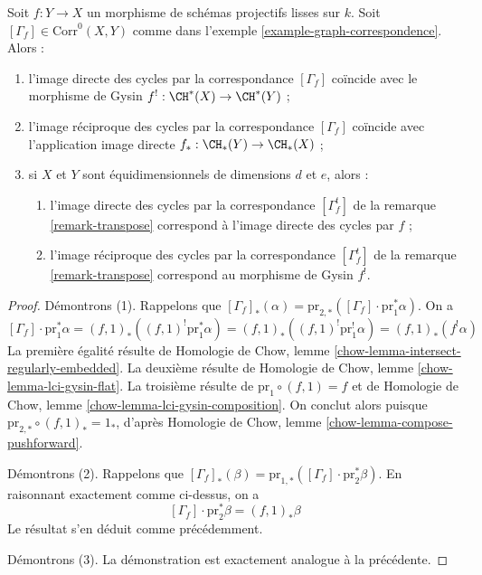 \begin{lemma}
\label{lemma-functor-and-cycles}
Soit $f : Y \to X$ un morphisme de schémas projectifs lisses sur $k$.
Soit $[\Gamma_f] \in \text{Corr}^0(X, Y)$ comme dans
l'exemple \ref{example-graph-correspondence}. Alors :
\begin{enumerate}
\item l'image directe des cycles par la correspondance $[\Gamma_f]$
coïncide avec le morphisme de Gysin $f^! : \CH^*(X) \to \CH^*(Y)$ ;
\item l'image réciproque des cycles par la correspondance $[\Gamma_f]$
coïncide avec l'application image directe $f_* : \CH_*(Y) \to \CH_*(X)$ ;
\item si $X$ et $Y$ sont équidimensionnels de dimensions $d$ et $e$,
alors :
\begin{enumerate}
\item l'image directe des cycles par la correspondance
$[\Gamma_f^t]$ de la remarque \ref{remark-transpose}
correspond à l'image directe des cycles par $f$ ;
\item l'image réciproque des cycles par la correspondance
$[\Gamma_f^t]$ de la remarque \ref{remark-transpose}
correspond au morphisme de Gysin $f^!$.
\end{enumerate}
\end{enumerate}
\end{lemma}

\begin{proof}
Démontrons (1). Rappelons que
$[\Gamma_f]_*(\alpha) =
\text{pr}_{2, *}([\Gamma_f] \cdot \text{pr}_1^*\alpha)$.
On a
$$
[\Gamma_f] \cdot \text{pr}_1^*\alpha =
(f, 1)_*((f, 1)^! \text{pr}_1^*\alpha) =
(f, 1)_*((f, 1)^! \text{pr}_1^!\alpha) =
(f, 1)_*(f^!\alpha)
$$
La première égalité résulte de Homologie de Chow, lemme
\ref{chow-lemma-intersect-regularly-embedded}.
La deuxième résulte de
Homologie de Chow, lemme \ref{chow-lemma-lci-gysin-flat}.
La troisième résulte de $\text{pr}_1 \circ (f, 1) = f$ et de
Homologie de Chow, lemme \ref{chow-lemma-lci-gysin-composition}.
On conclut alors puisque
$\text{pr}_{2, *} \circ (f, 1)_* = 1_*$, d'après
Homologie de Chow, lemme \ref{chow-lemma-compose-pushforward}.

\medskip\noindent
Démontrons (2). Rappelons que $[\Gamma_f]_*(\beta) =
\text{pr}_{1, *}([\Gamma_f] \cdot \text{pr}_2^*\beta)$.
En raisonnant exactement comme ci-dessus, on a
$$
[\Gamma_f] \cdot \text{pr}_2^*\beta = (f, 1)_*\beta
$$
Le résultat s'en déduit comme précédemment.

\medskip\noindent
Démontrons (3). La démonstration est exactement analogue à la précédente.
\end{proof}

